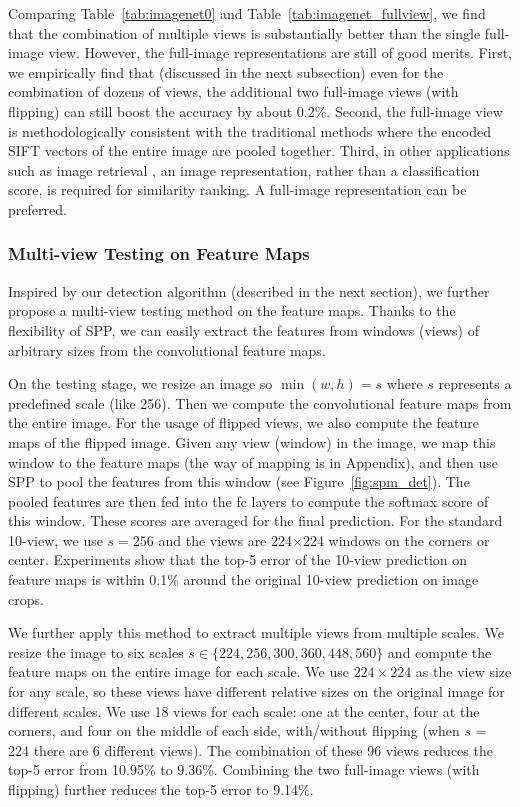 \documentclass[10pt,journal,cspaper,compsoc]{IEEEtran}
\begin{document}
Comparing Table~\ref{tab:imagenet0} and Table~\ref{tab:imagenet_fullview}, we find that the combination of multiple views is substantially better than the single full-image view. However, the full-image representations are still of good merits. First, we empirically find that (discussed in the next subsection) even for the combination of dozens of views, the additional two full-image views (with flipping) can still boost the accuracy by about 0.2\%. Second, the full-image view is methodologically consistent with the traditional methods \cite{Lazebnik2006,Yang2009,Perronnin2010} where the encoded SIFT vectors of the entire image are pooled together. Third, in other applications such as image retrieval \cite{Jegou2012}, an image representation, rather than a classification score, is required for similarity ranking. A full-image representation can be preferred.

\subsubsection{Multi-view Testing on Feature Maps}
\label{subsec:multi_view_testing}

Inspired by our detection algorithm (described in the next section), we further propose a multi-view testing method on the feature maps. Thanks to the flexibility of SPP, we can easily extract the features from windows (views) of arbitrary sizes from the convolutional feature maps.

On the testing stage, we resize an image so $\min(w,h)=s$ where $s$ represents a predefined scale (like 256). Then we compute the convolutional feature maps from the entire image. For the usage of flipped views, we also compute the feature maps of the flipped image.
Given any view (window) in the image, we map this window to the feature maps (the way of mapping is in Appendix), and then use SPP to pool the features from this window (see Figure~\ref{fig:spm_det}). The pooled features are then fed into the fc layers to compute the softmax score of this window. These scores are averaged for the final prediction. For the standard 10-view, we use $s=256$ and the views are 224$\times$224 windows on the corners or center. Experiments show that the top-5 error of the 10-view prediction on feature maps is within 0.1\% around the original 10-view prediction on image crops.

We further apply this method to extract multiple views from multiple scales. We resize the image to six scales $s\in\{224,256,300,360,448,560\}$ and compute the feature maps on the entire image for each scale. We use $224\times224$ as the view size for any scale, so these views have different relative sizes on the original image for different scales. We use 18 views for each scale: one at the center, four at the corners, and four on the middle of each side, with/without flipping (when $s$ = 224 there are 6 different views). The combination of these 96 views reduces the top-5 error from 10.95\% to 9.36\%. Combining the two full-image views (with flipping) further reduces the top-5 error to 9.14\%.
\end{document}
